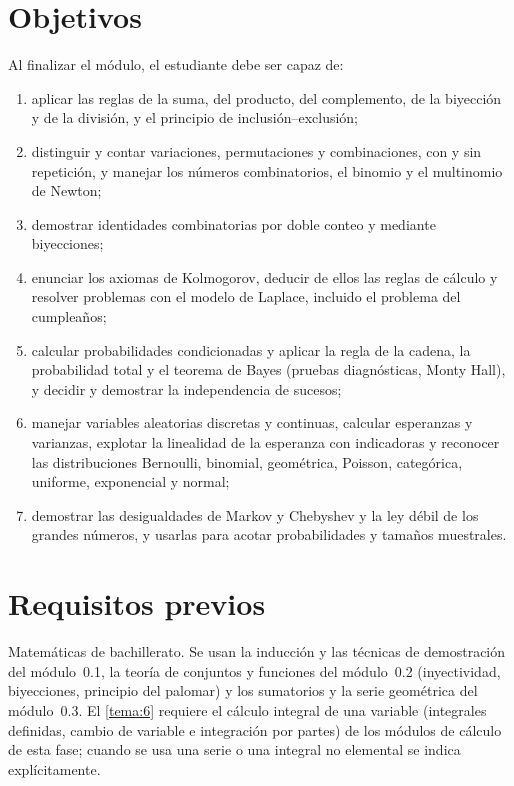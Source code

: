\documentclass[11pt,a4paper,twoside,openany]{book}
\begin{document}
\section*{Objetivos}
Al finalizar el módulo, el estudiante debe ser capaz de:
\begin{enumerate}[label=\arabic*.]
  \item aplicar las reglas de la suma, del producto, del complemento, de la biyección y de la división, y el principio de inclusión--exclusión;
  \item distinguir y contar variaciones, permutaciones y combinaciones, con y sin repetición, y manejar los números combinatorios, el binomio y el multinomio de Newton;
  \item demostrar identidades combinatorias por doble conteo y mediante biyecciones;
  \item enunciar los axiomas de Kolmogorov, deducir de ellos las reglas de cálculo y resolver problemas con el modelo de Laplace, incluido el problema del cumpleaños;
  \item calcular probabilidades condicionadas y aplicar la regla de la cadena, la probabilidad total y el teorema de Bayes (pruebas diagnósticas, Monty Hall), y decidir y demostrar la independencia de sucesos;
  \item manejar variables aleatorias discretas y continuas, calcular esperanzas y varianzas, explotar la linealidad de la esperanza con indicadoras y reconocer las distribuciones Bernoulli, binomial, geométrica, Poisson, categórica, uniforme, exponencial y normal;
  \item demostrar las desigualdades de Markov y Chebyshev y la ley débil de los grandes números, y usarlas para acotar probabilidades y tamaños muestrales.
\end{enumerate}

\section*{Requisitos previos}
Matemáticas de bachillerato. Se usan la inducción y las técnicas de demostración del módulo~0.1, la teoría de conjuntos y funciones del módulo~0.2 (inyectividad, biyecciones, principio del palomar) y los sumatorios y la serie geométrica del módulo~0.3. El \cref{tema:6} requiere el cálculo integral de una variable (integrales definidas, cambio de variable e integración por partes) de los módulos de cálculo de esta fase; cuando se usa una serie o una integral no elemental se indica explícitamente.
\end{document}
